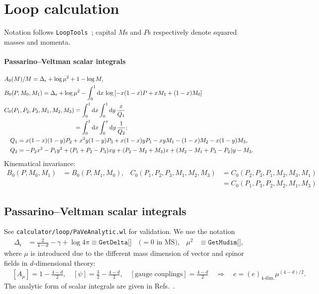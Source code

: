 \documentclass[CheatSheet]{subfiles}
\begin{document}
\summarystyle
\section{Loop calculation}
Notation follows \texttt{LoopTools}~\cite{looptools}; capital $M$s and $P$s respectively denote squared masses and momenta.
\paragraph{Passarino--Veltman scalar integrals}
\begin{align}
& A_0(M)/M = \Delta_\epsilon+\log\mu^2+1-\log M,\\
& B_0(P, M_0, M_1) = \Delta_\epsilon + \log \mu^2 - \int_0^1\mathop{}\!\mathrm{d} x\,\log\left[
    -x(1-x)P+x M_1+(1-x)M_0
\right]\\
& C_0(P_1, P_2, P_3, M_1, M_2, M_3)
= \int_0^1 \mathop{}\!\mathrm{d} x \int_0^1\mathop{}\!\mathrm{d} y\,
  \frac{x}{Q_1}\\
&\phantom{C_0(P_1, P_2, P_3, M_1, M_2, M_3)}
= \int_0^1 \mathop{}\!\mathrm{d} x \int_0^x\mathop{}\!\mathrm{d} y\,
  \frac{1}{Q_2};
\\
&\quad Q_1=x(1-x)(1-y)P_2 + x^2 y(1-y)P_3 + x(1-x)y P_1 - x y M_1 - (1-x) M_2 - x(1-y) M_3,\notag\\
&\quad Q_2=-P_2x^2-P_1y^2+(P_1+P_2-P_3)x y + (P_2-M_2+M_3)x + (M_2-M_1+P_3-P_2)y-M_3.\notag
\end{align}
Kinematical invariance:
\begin{equation}
\begin{split}
 B_0(P, M_0, M_1) &= B_0(P, M_1, M_0),
 &
 C_0(P_1,P_2,P_3,M_1,M_2,M_3) &= C_0(P_2,P_3,P_1,M_2,M_3,M_1)
                        \\&& &= C_0(P_1,P_3,P_2,M_2,M_1,M_3)
\end{split}
\end{equation}


\clearpage
\detailstyle
\changefontsizes{9pt}
\subsection{Passarino--Veltman scalar integrals}
See \texttt{calculator/loop/PaVeAnalytic.wl} for validation.
We use the notation~\cite{romaoAQFT,looptools}
\begin{align}
  \Delta_\epsilon &= \frac{2}{4-d}-\gamma+\log4\pi \equiv \texttt{GetDelta[]}\quad\text{($=0$ in $\overline{\text{MS}}$)},
&
  \mu^2&\equiv\texttt{GetMudim[]},
\end{align}
where $\mu$ is introduced due to the different mass dimension of vector and spinor fields in $d$-dimensional theory:
\begin{align}
 &[A_\mu]=1-\frac{4-d}{2},\quad
  [\psi]=\frac32 - \frac{4-d}{2},\quad
  [\text{gauge couplings}] = \frac{4-d}{2} \quad \Rightarrow\quad e=  (e)_{\text{4-dim.}}\mu^{(4-d)/2}.
\end{align}
The analytic form of scalar integrals are given in Refs.~\cite{Passarino:1978jh,CabralRosetti:1998sp,romaoAQFT}.


\end{document}
